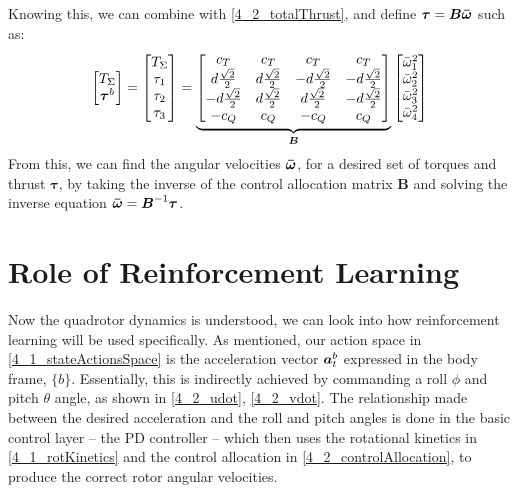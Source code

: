 Knowing this, we can combine with \eqref{4_2_totalThrust}, and define $\boldsymbol{\tau} = \boldsymbol{B} \boldsymbol{\Bar{\omega}}$ such as:
\begin{equation}
    \begin{bmatrix}
        T_\Sigma \\ \boldsymbol{\tau}^b
    \end{bmatrix}
    = \begin{bmatrix}
        T_\Sigma \\ \tau_1 \\ \tau_2 \\ \tau_3
    \end{bmatrix}
    = \underbrace{
        \begin{bmatrix} 
            c_T & c_T & c_T & c_T \\ 
            d\frac{\sqrt{2}}{2} & d\frac{\sqrt{2}}{2} & -d\frac{\sqrt{2}}{2} & -d\frac{\sqrt{2}}{2} \\ 
            -d\frac{\sqrt{2}}{2} & d\frac{\sqrt{2}}{2} & d\frac{\sqrt{2}}{2} & -d\frac{\sqrt{2}}{2} \\ 
            -c_Q & c_Q & -c_Q & c_Q 
        \end{bmatrix}
    }_{\boldsymbol{B}}
    \begin{bmatrix}
    \Bar{\omega}_1^2 \\
    \Bar{\omega}_2^2 \\
    \Bar{\omega}_3^2 \\
    \Bar{\omega}_4^2 \\
    \end{bmatrix}
    \label{4_2_controlAllocation}
\end{equation}
From this, we can find the angular velocities $\boldsymbol{\Bar{\omega}}$, for a desired set of torques and thrust $\boldsymbol{\tau}$, by taking the inverse of the control allocation matrix $\boldsymbol{B}$ and solving the inverse equation $\boldsymbol{\Bar{\omega}} = \boldsymbol{B}^{-1} \boldsymbol{\tau}$.  


\section{Role of Reinforcement Learning}

Now the quadrotor dynamics is understood, we can look into how reinforcement learning will be used specifically. As mentioned, our action space in \eqref{4_1_stateActionsSpace} is the acceleration vector ${\boldsymbol{a}}^b_t$ expressed in the body frame, $\{b\}$. Essentially, this is indirectly achieved by commanding a roll $\phi$ and pitch $\theta$ angle, as shown in \eqref{4_2_udot}, \eqref{4_2_vdot}. The relationship made between the desired acceleration and the roll and pitch angles is done in the basic control layer -- the PD controller -- which then uses the rotational kinetics in \eqref{4_1_rotKinetics} and the control allocation in \eqref{4_2_controlAllocation}, to produce the correct rotor angular velocities.

